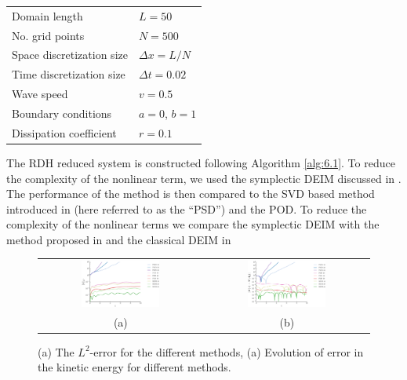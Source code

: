 \vspace{0.5cm}
\begin{center}
\begin{tabular}{|l|l|}
\hline
Domain length & $L = 50$ \\
No. grid points & $N = 500$ \\
Space discretization size & $\Delta x = L/N$ \\
Time discretization size & $\Delta t = 0.02$ \\
Wave speed & $v = 0.5$ \\
Boundary conditions & $a = 0$, $b=1$\\
Dissipation coefficient & $r = 0.1$ \\
\hline
\end{tabular}
\end{center}
\vspace{0.5cm}

The RDH reduced system is constructed following Algorithm \ref{alg:6.1}. To reduce the complexity of the nonlinear term, we used the symplectic DEIM discussed in . The performance of the method is then compared to the SVD based method introduced in  (here referred to as the ``PSD'') and the POD. To reduce the complexity of the nonlinear terms we compare the symplectic DEIM with the method proposed in \cite{doi:10.1137/140978922} and the classical DEIM in 


\begin{figure}[t]
\begin{tabular}{cc}
\includegraphics[width=0.5\textwidth]{./images/paper3/wave_nonlin/error_nonlin} & 
\includegraphics[width=0.5\textwidth]{./images/paper3/wave_nonlin/energy_nonlin} \\
(a) & (b)
\end{tabular}
\caption{(a) The $L^2$-error for the different methods, (a) Evolution of error in the kinetic energy for different methods.} \label{fig:added4.1}
\end{figure}


